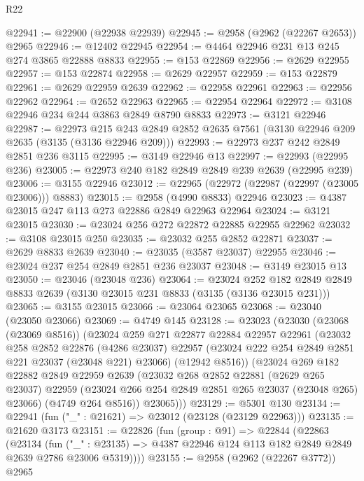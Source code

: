 \begin{lexlean}{R22}
\begin{coremodule}
@22941 := @22900 (@22938 @22939)
@22945 := @2958 (@2962 (@22267 @2653)) @2965
@22946 := @12402 @22945
@22954 := @4464 @22946 @231 @13 @245 @274 @3865 @22888 @8833
@22955 := @153 @22869
@22956 := @2629 @22955
@22957 := @153 @22874
@22958 := @2629 @22957
@22959 := @153 @22879
@22961 := @2629 @22959 @2639
@22962 := @22958 @22961
@22963 := @22956 @22962
@22964 := @2652 @22963
@22965 := @22954 @22964
@22972 := @3108 @22946 @234 @244 @3863 @2849 @8790 @8833
@22973 := @3121 @22946
@22987 := @22973
    @215
    @243
    @2849
    @2852
    @2635
    @7561
    (@3130 @22946 @209 @2635 (@3135 (@3136 @22946 @209)))
@22993 := @22973 @237 @242 @2849 @2851 @236 @3115
@22995 := @3149 @22946 @13
@22997 := @22993 (@22995 @236)
@23005 := @22973 @240 @182 @2849 @2849 @239 @2639 (@22995 @239)
@23006 := @3155 @22946
@23012 := @22965 (@22972 (@22987 (@22997 (@23005 @23006))) @8883)
@23015 := @2958 (@4990 @8833) @22946
@23023 := @4387 @23015 @247 @113 @273 @22886 @2849 @22963 @22964
@23024 := @3121 @23015
@23030 := @23024 @256 @272 @22872 @22885 @22955 @22962
@23032 := @3108 @23015 @250
@23035 := @23032 @255 @2852 @22871
@23037 := @2629 @8833 @2639
@23040 := @23035 (@3587 @23037) @22955
@23046 := @23024 @237 @254 @2849 @2851 @236 @23037
@23048 := @3149 @23015 @13
@23050 := @23046 (@23048 @236)
@23064 := @23024
    @252
    @182
    @2849
    @2849
    @8833
    @2639
    (@3130 @23015 @231 @8833 (@3135 (@3136 @23015 @231)))
@23065 := @3155 @23015
@23066 := @23064 @23065
@23068 := @23040 (@23050 @23066)
@23069 := @4749 @145
@23128 := @23023
    (@23030
      (@23068 (@23069 @8516))
      (@23024
        @259
        @271
        @22877
        @22884
        @22957
        @22961
        (@23032
          @258
          @2852
          @22876
          (@4286 @23037)
          @22957
          (@23024 @222 @254 @2849 @2851 @221 @23037 (@23048 @221) @23066)
          (@12942 @8516))
        (@23024
          @269
          @182
          @22882
          @2849
          @22959
          @2639
          (@23032
            @268
            @2852
            @22881
            (@2629 @265 @23037)
            @22959
            (@23024 @266 @254 @2849 @2851 @265 @23037 (@23048 @265) @23066)
            (@4749 @264 @8516))
          @23065)))
@23129 := @5301 @130
@23134 := @22941 (fun ("_" : @21621) => @23012 (@23128 (@23129 @22963)))
@23135 := @21620 @3173
@23151 := @22826
    (fun (group : @91) =>
    @22844
      (@22863
        (@23134
          (fun ("_" : @23135) =>
          @4387 @22946 @124 @113 @182 @2849 @2849 @2639 @2786 @23006 @5319))))
@23155 := @2958 (@2962 (@22267 @3772)) @2965

\end{coremodule}
\end{lexlean}
